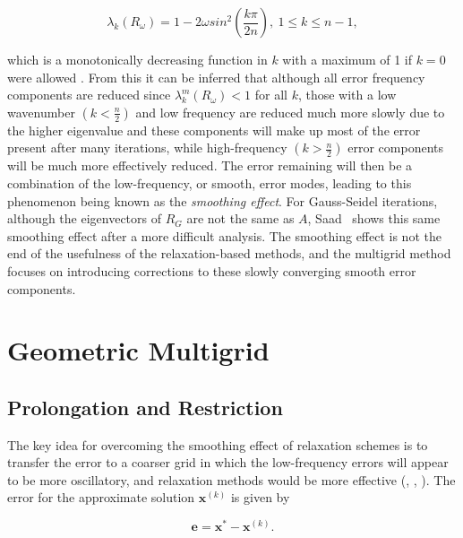 \begin{equation}
	\lambda_k(R_{\omega}) = 1 - 2\omega sin^2\left(\frac{k\pi}{2n}\right),\ 1 \leq k \leq n-1,
\end{equation}

which is a monotonically decreasing function in $k$ with a maximum of 1 if $k = 0$ were allowed \cite{Briggs2000}. From this it can be inferred that although all error frequency components are reduced since $\lambda_k^m(R_{\omega}) < 1$ for all $k$, those with a low wavenumber $\left(k < \frac{n}{2}\right)$ and low frequency are reduced much more slowly due to the higher eigenvalue and these components will make up most of the error present after many iterations, while high-frequency $\left(k > \frac{n}{2}\right)$ error components will be much more effectively reduced. The error remaining will then be a combination of the low-frequency, or smooth, error modes, leading to this phenomenon being known as the \emph{smoothing effect}. For Gauss-Seidel iterations, although the eigenvectors of $R_G$ are not the same as $A$, Saad~\cite{Saad2003} shows this same smoothing effect after a more difficult analysis. The smoothing effect is not the end of the usefulness of the relaxation-based methods, and the multigrid method focuses on introducing corrections to these slowly converging smooth error components.


\section{Geometric Multigrid}


\subsection{Prolongation and Restriction}

The key idea for overcoming the smoothing effect of relaxation schemes is to transfer the error to a coarser grid in which the low-frequency errors will appear to be more oscillatory, and relaxation methods would be more effective (\cite{Briggs2000}, \cite{Ruge1987}, \cite{Saad2003}). The error for the approximate solution $\mathbf{x}^{(k)}$ is given by

\begin{equation}
	\mathbf{e} = \mathbf{x}^* - \mathbf{x}^{(k)}.
\end{equation}

